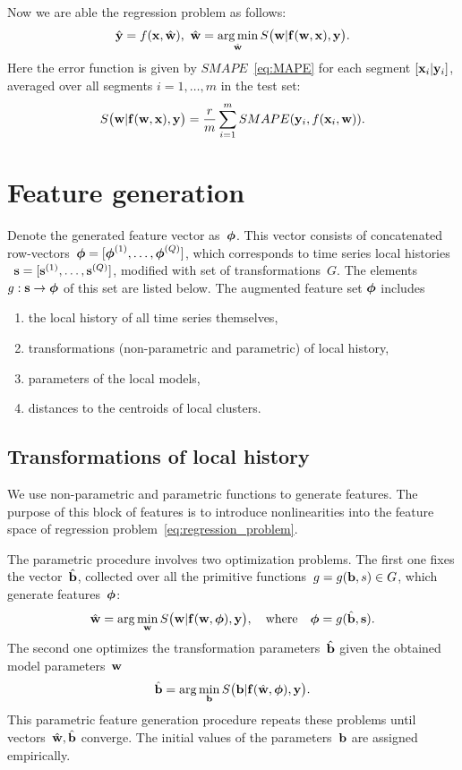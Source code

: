 \documentclass[conference]{IEEEtran}
\begin{document}

Now we are able the regression problem as follows:
\begin{equation}\label{eq:regression_problem}
\hat{\y} = f(\x, \hat{\w}), ~\hat{\w} = \argmin_{\hat{\w}}S\bigl(\bw|\fx(\bw,\bx),\by\bigr). %
\end{equation}
Here the error function is given by $SMAPE$~\eqref{eq:MAPE} for each segment $[{\mathbf{x}}_i | {\mathbf{y}}_i]$, averaged over all segments $i = 1, \dots, m$ in the test set:
\[ S\bigl(\mathbf{w}|{\mathbf{f}}(\mathbf{w},{\mathbf{x}}),{\mathbf{y}}\bigr) = \frac{r}{m}\sum_{i=1}^{m} SMAPE({\mathbf{y}}_i, f({\mathbf{x}}_i, {\mathbf{w}})).\]

\section{Feature generation}\label{sc:feature_generation}
Denote the generated feature vector as~${\boldsymbol{\phi}}$. This vector consists of concatenated row-vectors~${\boldsymbol{\phi}}=[{\boldsymbol{\phi}}^{(1)},\dots,{\boldsymbol{\phi}}^{(Q)}]$, which corresponds to time series local histories ~${\mathbf{s}}=[{\mathbf{s}}^{(1)},\dots,{\mathbf{s}}^{(Q)}]$, modified with set of transformations~$G$. The elements~$g:{\mathbf{s}}\to{\boldsymbol{\phi}}$ of this set are listed below. The augmented feature set ${\boldsymbol{\phi}}$ includes
\begin{enumerate}[1)]
\item the local history of all time series themselves,
\item transformations (non-parametric and parametric) of local history,
\item parameters of the local models,
\item distances to the centroids of local clusters.
\end{enumerate}



\subsection{Transformations of local history}\label{sc:Transform}
We use non-parametric and parametric functions to generate features. The purpose of this block of features is to introduce nonlinearities into the feature space of regression problem~\eqref{eq:regression_problem}.

The parametric procedure involves two optimization problems. The first one fixes the vector~$\hat{{\mathbf{b}}}$, collected over all the primitive functions~$g=g({\mathbf{b}},s) \in G$, which generate features~${\boldsymbol{\phi}}$:
\[
\hat{\mathbf{w}} = \arg\min_{\mathbf{w}} S\bigl(\mathbf{w}|{\mathbf{f}}(\mathbf{w},{\boldsymbol{\phi}}),{\mathbf{y}}\bigr),\quad
\text{where}
\quad {\boldsymbol{\phi}} = g(\hat{{\mathbf{b}}},{\mathbf{s}}).
\]
The second one optimizes the transformation parameters~$\hat{{\mathbf{b}}}$ given the obtained model parameters~$\mathbf{w}$
\[
\hat{{\mathbf{b}}} = \arg\min_{{\mathbf{b}}} S\bigl({\mathbf{b}}|{\mathbf{f}}(\hat{\mathbf{w}},{\boldsymbol{\phi}}),{\mathbf{y}}\bigr).
\]
This parametric feature generation procedure repeats these problems until vectors~$\hat{\mathbf{w}},\hat{{\mathbf{b}}}$ converge. The initial values of the parameters~${\mathbf{b}}$ are assigned empirically.
\end{document}
